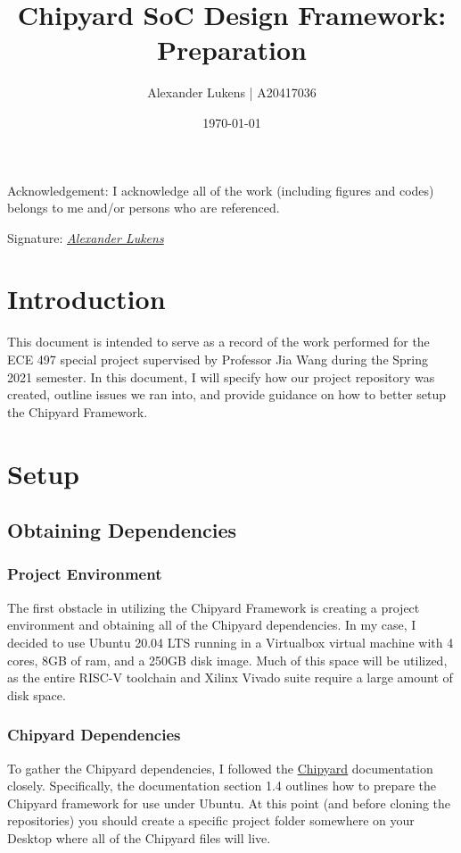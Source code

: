 \documentclass{article}
\begin{document}
	\begin{titlepage}
		\vspace{1in}
		\title{Chipyard SoC Design Framework: Preparation}
		\author{Alexander Lukens | A20417036}
		\date{\today}
	\end{titlepage}
	\maketitle
	\vspace*{\fill}
	\begin{center}
	Acknowledgement: I acknowledge all of the work (including figures and codes) belongs to me and/or persons who are referenced.
	
	
	Signature: \textit{\underline{Alexander Lukens}}
\end{center} 
	\newpage
	\section{Introduction}
	This document is intended to serve as a record of the work performed for the ECE 497 special project supervised by Professor Jia Wang during the Spring 2021 semester. In this document, I will specify how our project repository was created, outline issues we ran into, and provide guidance on how to better setup the Chipyard Framework.
	
	\section{Setup}
	\subsection{Obtaining Dependencies}
	\subsubsection{Project Environment}
	The first obstacle in utilizing the Chipyard Framework is creating a project environment and obtaining all of the Chipyard dependencies.	In my case, I decided to use Ubuntu 20.04 LTS running in a Virtualbox virtual machine with 4 cores, 8GB of ram, and a 250GB disk image. Much of this space will be utilized, as the entire RISC-V toolchain and Xilinx Vivado suite require a large amount of disk space.
	
	\subsubsection{Chipyard Dependencies}
	To gather the Chipyard dependencies, I followed the \hyperref{https://chipyard.readthedocs.io/en/latest/}{}{}{Chipyard} documentation closely. Specifically, the documentation section 1.4 outlines how to prepare the Chipyard framework for use under Ubuntu. At this point (and before cloning the repositories) you should create a specific project folder somewhere on your Desktop where all of the Chipyard files will live.
	
\end{document}
